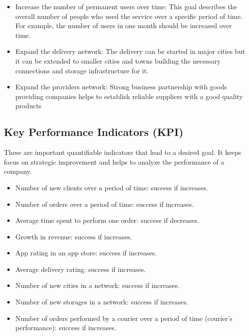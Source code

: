 \begin{itemize}
    \item Increase the number of permanent users over time:
    This goal describes the overall number of people who used the service over a specific period of time. For example, the number of users in one month should be increased over time.
    \item Expand the delivery network:
    The delivery can be started in major cities but it can be extended to smaller cities and towns building the necessary connections and storage infrastructure for it.
    \item Expand the providers network:
Strong business partnership with goods providing companies helps to establish reliable suppliers with a good quality products
\end{itemize}

\subsection{Key Performance Indicators (KPI)}

These are important quantifiable indicators that lead to a desired goal.
It keeps focus on strategic improvement and helps to analyze the performance of a company.

\begin{itemize}
    \item Number of new clients over a period of time: success if increases.
    \item Number of orders over a period of time: success if increases.
    \item Average time spent to perform one order: success if decreases.
    \item Growth in revenue: success if increases.
    \item App rating in an app store: success if increases.
    \item Average delivery rating: success if increases.
    \item Number of new cities in a network: success if increases.
    \item Number of new storages in a network: success if increases.
    \item Number of orders performed by a courier over a period of time (courier’s performance): success if increases.
\end{itemize}
